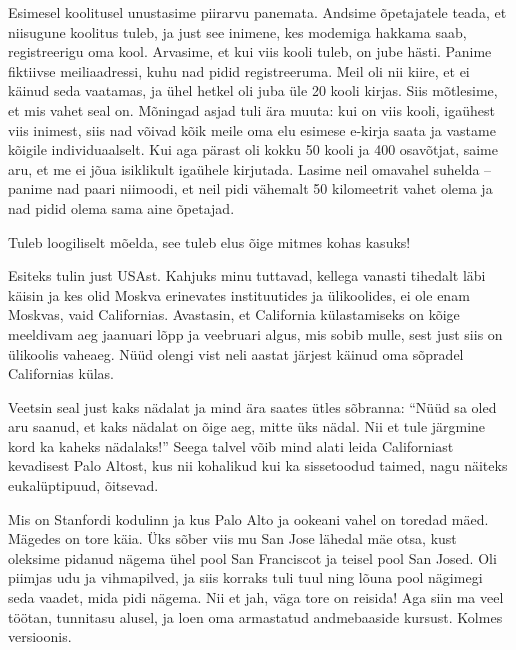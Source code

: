 Esimesel koolitusel unustasime piirarvu panemata. Andsime õpetajatele teada, et niisugune koolitus 
tuleb, ja just see inimene, kes modemiga hakkama saab, 
registreerigu oma kool. Arvasime, et kui viis kooli tuleb, on jube 
hästi. Panime fiktiivse meiliaadressi, kuhu nad pidid registreeruma. Meil oli nii kiire, et ei käinud seda vaatamas, ja ühel hetkel 
oli juba üle 20 kooli kirjas. Siis mõtlesime, et 
mis vahet seal on. Mõningad asjad tuli ära muuta: kui on viis 
kooli, igaühest viis inimest, siis nad võivad kõik meile oma elu esimese 
e-kirja saata ja vastame kõigile individuaalselt. Kui aga pärast oli kokku 50 kooli 
ja 400 osavõtjat, saime aru, et me ei jõua isiklikult igaühele 
kirjutada. Lasime neil omavahel suhelda – panime nad 
paari niimoodi, et neil pidi vähemalt 50 kilomeetrit vahet olema ja nad pidid olema sama aine 
õpetajad.


Tuleb loogiliselt mõelda, see tuleb elus õige mitmes 
kohas kasuks! 


Esiteks tulin just USAst. Kahjuks minu tuttavad, 
kellega vanasti tihedalt läbi käisin ja kes olid Moskva erinevates 
instituutides ja ülikoolides, ei ole enam Moskvas, vaid Californias. Avastasin, et California külastamiseks on kõige meeldivam aeg 
jaanuari lõpp ja veebruari algus, mis sobib mulle, sest just siis on ülikoolis 
vaheaeg. Nüüd olengi vist neli aastat järjest käinud oma sõpradel Californias külas. 

Veetsin seal just kaks nädalat 
ja mind ära saates ütles sõbranna: \enquote{Nüüd sa oled aru saanud, et kaks 
nädalat on õige aeg, mitte üks nädal. Nii et tule järgmine kord ka kaheks 
nädalaks!} Seega talvel võib mind alati leida 
Californiast kevadisest Palo Altost, kus nii kohalikud kui ka 
sissetoodud taimed, nagu näiteks eukalüptipuud, õitsevad. 


Mis on Stanfordi kodulinn ja kus Palo Alto ja ookeani vahel on toredad 
mäed. Mägedes on tore käia. Üks sõber 
viis mu San Jose lähedal mäe otsa, kust oleksime pidanud nägema ühel pool 
San Franciscot ja teisel pool San Josed. Oli piimjas udu ja vihmapilved, ja siis korraks tuli tuul 
ning lõuna pool nägimegi seda vaadet, mida pidi nägema. Nii et jah, väga tore 
on reisida! Aga siin ma veel töötan, tunnitasu alusel, ja loen oma 
armastatud andmebaaside kursust. Kolmes versioonis.